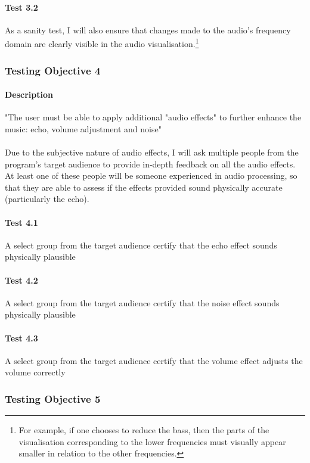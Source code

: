 \paragraph{Test 3.2}
As a sanity test, I will also ensure that changes made to the audio's frequency domain are clearly visible in the audio visualisation.\footnote{
	For example, if one chooses to reduce the bass, then the parts
	of the visualisation corresponding to the lower frequencies must
	visually appear smaller in relation to the other frequencies.
}

\pagebreak
\subsubsection{Testing Objective 4}
\paragraph{Description} "The user must be able to apply additional "audio effects" to further enhance the music: echo, volume adjustment and noise"

\paragraph{}
Due to the subjective nature of audio effects, I will ask multiple people from the program's target audience to provide in-depth feedback on all the audio effects.
At least one of these people will be someone experienced in audio processing, so that they are able to assess if the effects provided sound physically accurate
(particularly the echo).

\paragraph{Test 4.1} A select group from the target audience certify that the echo effect sounds physically plausible
\paragraph{Test 4.2} A select group from the target audience certify  that the noise effect sounds physically plausible
\paragraph{Test 4.3} A select group from the target audience certify that the volume effect adjusts the volume correctly

\pagebreak
\subsubsection{Testing Objective 5}
